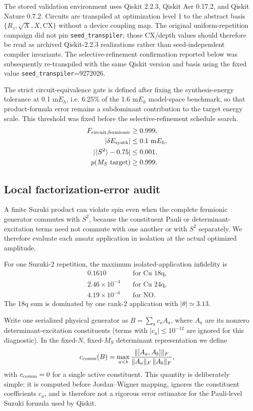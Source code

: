 \documentclass[
 aip,
 jcp,
 amsmath,amssymb,
 preprint
]{revtex4-2}
\begin{document}
The stored validation environment uses Qiskit 2.2.3, Qiskit Aer 0.17.2, and Qiskit Nature 0.7.2.
Circuits are transpiled at optimization level 1 to the abstract basis
$\{R_z,\sqrt X,X,\mathrm{CX}\}$ without a device coupling map.
The original uniform-repetition campaign did not pin \texttt{seed\_transpiler}; those CX/depth values should therefore be read as archived Qiskit-2.2.3 realizations rather than seed-independent compiler invariants.
The selective-refinement confirmation reported below was subsequently re-transpiled with the same Qiskit version and basis using the fixed value \texttt{seed\_transpiler}=9272026.

The strict circuit-equivalence gate is defined after fixing the synthesis-energy tolerance at
0.1 m$E_h$, i.e. 6.25\% of the 1.6 m$E_h$ model-space benchmark, so that product-formula error
remains a subdominant contribution to the target energy scale. This threshold was fixed
before the selective-refinement schedule search.
\begin{align}
F_{\rm circuit,fermionic}&\ge0.999,\\
|\delta E_{\rm synth}|&\le0.1~{\rm m}E_h,\\
|\langle S^2\rangle-0.75|&\le0.001,\\
p(M_S{\rm\ target})&\ge0.999.
\end{align}

\subsection{Local factorization-error audit}

A finite Suzuki product can violate spin even when the complete fermionic generator commutes with $S^2$, because the constituent Pauli or determinant-excitation terms need not commute with one another or with $S^2$ separately.
We therefore evaluate each ansatz application in isolation at the actual optimized amplitude.

For one Suzuki-2 repetition, the maximum isolated-application infidelity is
\begin{align}
0.1610 &\quad\text{for Cu 18q},\\
2.46\times10^{-4} &\quad\text{for Cu 24q},\\
4.19\times10^{-6} &\quad\text{for NO}.
\end{align}
The 18q sum is dominated by one rank-2 application with $|\theta|\simeq3.13$.

Write one serialized physical generator as $B=\sum_a c_aA_a$, where $A_a$ are its nonzero determinant-excitation constituents (terms with $|c_a|\le10^{-12}$ are ignored for this diagnostic).
In the fixed-$N$, fixed-$M_S$ determinant representation we define
\begin{equation}
c_{\rm comm}(B)
=
\max_{a<b}
\frac{\|[A_a,A_b]\|_F}
{\|A_a\|_F\,\|A_b\|_F},
\label{eq:ccomm}
\end{equation}
with $c_{\rm comm}=0$ for a single active constituent.
This quantity is deliberately simple: it is computed before Jordan--Wigner mapping, ignores the constituent coefficients $c_a$, and is therefore not a rigorous error estimator for the Pauli-level Suzuki formula used by Qiskit.
\end{document}
